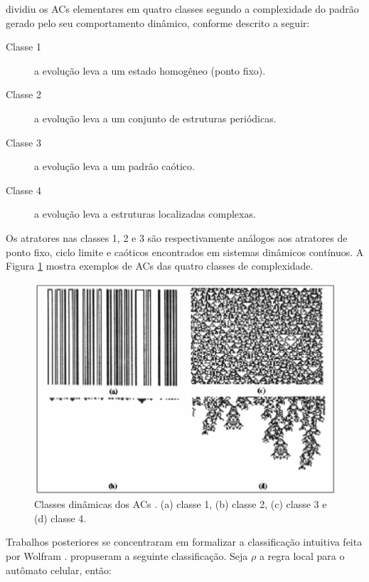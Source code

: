 \documentclass[12pt,a4paper]{article}
\begin{document}
 dividiu os ACs elementares em quatro
classes segundo a complexidade do padrão gerado pelo seu comportamento dinâmico,
conforme descrito a seguir:

\begin{description}
\item[Classe 1] a evolução leva a um estado homogêneo (ponto fixo).
\item[Classe 2] a evolução leva a um conjunto de estruturas periódicas.
\item[Classe 3] a evolução leva a um padrão caótico.
\item[Classe 4] a evolução leva a estruturas localizadas complexas.
\end{description}

Os atratores nas classes 1, 2 e 3 são respectivamente análogos aos atratores
de ponto fixo, ciclo limite e caóticos encontrados em sistemas dinâmicos
contínuos. A Figura \ref{fig:classes} mostra exemplos de ACs
das quatro classes de complexidade.

\begin{figure}[htp]
\begin{center}
\includegraphics[scale=0.5]{img/classes.eps}
\caption{Classes dinâmicas dos ACs .
(a) classe 1, (b) classe 2, (c) classe 3 e (d) classe 4.}
\label{fig:classes}
\end{center}
\end{figure}

Trabalhos posteriores se concentraram em formalizar a classificação intuitiva
feita por Wolfram .  propuseram a seguinte
classificação.  Seja $\rho$ a regra local para o autômato celular, então:
\end{document}
